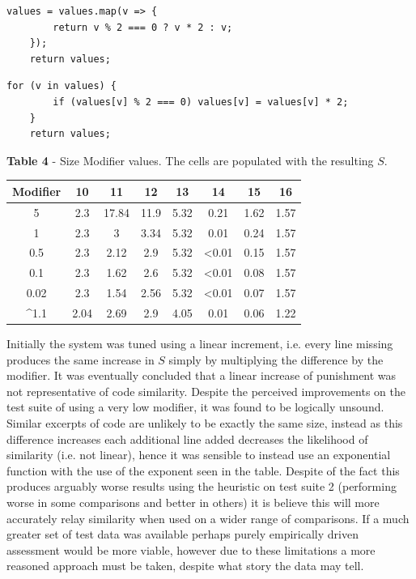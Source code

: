 \documentclass[jou,apacite]{apa6}
\begin{document}
\begin{lstlisting}[caption=Comparison 16a - semantically equivalent structurally dissimiliar]
values = values.map(v => {
		return v % 2 === 0 ? v * 2 : v;
	});
	return values;
\end{lstlisting}
\begin{lstlisting}[caption=Comparison 16b - - semantically equivalent structurally dissimiliar]
	for (v in values) {
		if (values[v] % 2 === 0) values[v] = values[v] * 2;
	}
	return values;
\end{lstlisting}

\textbf{Table 4} - Size Modifier values. The cells are populated with the resulting $S$.

\renewcommand{\arraystretch}{1.5}

\begin{center}
 \begin{tabular}{||c c c c c c c c ||} 
 \hline
 Modifier & 10 & 11 & 12 & 13 & 14 & 15 & 16 \\ [-0.2ex] 
 \hline\hline
 5   & 2.3 & 17.84 & 11.9 & 5.32 & 0.21 & 1.62 & 1.57  \\ 
 \hline
 1 & 2.3 & 3 & 3.34 & 5.32 & 0.01 & 0.24 & 1.57 \\ 
  \hline
  0.5 & 2.3 & 2.12 & 2.9 & 5.32 & <0.01 & 0.15 & 1.57  \\ 
   \hline
   0.1 & 2.3 & 1.62 & 2.6 & 5.32 & <0.01 & 0.08 & 1.57 \\ 
    \hline
     0.02 & 2.3 & 1.54 & 2.56 & 5.32 & <0.01 & 0.07 & 1.57\\  
     \hline
      \textasciicircum 1.1 & 2.04 & 2.69 & 2.9 & 4.05 & 0.01 & 0.06 & 1.22 \\ 
      \hline
\end{tabular}
\end{center}

Initially the system was tuned using a linear increment, i.e. every line missing produces the same increase in $S$ simply by multiplying the difference by the modifier. It was eventually concluded that a linear increase of punishment was not representative of code similarity. Despite the perceived improvements on the test suite of using a very low modifier, it was found to be logically unsound. Similar excerpts of code are unlikely to be exactly the same size, instead as this difference increases each additional line added decreases the likelihood of similarity (i.e. not linear), hence it was sensible to instead use an exponential function with the use of the exponent seen in the table.  Despite of the fact this produces arguably worse results using the heuristic on test suite 2 (performing worse in some comparisons and better in others) it is believe this will more accurately relay similarity when used on a wider range of comparisons. If a much greater set of test data was available perhaps purely empirically driven assessment would be more viable, however due to these limitations a more reasoned approach must be taken, despite what story the data may tell. 
\end{document}
